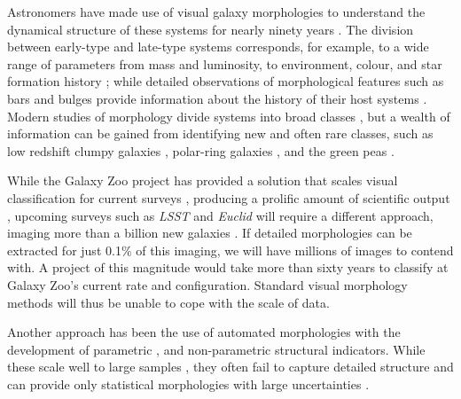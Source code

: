 \documentclass[twocolumn]{aastex6}%
\begin{document}
Astronomers have made use of visual galaxy morphologies to understand the dynamical structure of these systems for nearly ninety years 
\citep[e.g.,][]{Hubble1936, 
			deVauc1959, 
			Sandage1961, 
			vandenBergh1976, 
			NairAbraham2010, 
			Baillard2011}. 
The division between early-type and late-type systems corresponds, for example, to a wide range of parameters from mass and luminosity, to environment, colour, and star formation history 
\citep[e.g.,][]{Kormendy1977,  
			Dressler1980, 
			Strateva2001, 
			Blanton2003, 
			Kauffman2003, 
			Nakamura2003, 
			Shen2003, 
			Peng2010}; 
while detailed observations of morphological features such as bars and bulges 
provide information about the history of their host systems 
\citep[e.g., review by][]{KK04, 
			Elmegreen2008, 
			Sheth2008, 
			Masters2010, 
			Simmons2014}. 
Modern studies of morphology  divide systems into broad classes 
\citep[e.g.,][]{Conselice2006, 
			Lintott2008, 
			Kartaltepe2015, 
			Peth2016}, 
but a wealth of information can be gained from identifying new and often rare classes, 
such as low redshift clumpy galaxies \citep[e.g.,][]{Elmegreen2013}, polar-ring galaxies \citep[e.g.,][]{Whitmore1990}, and the green peas \citep{Cardamone2009}. 


While the Galaxy Zoo project has provided a solution that scales visual classification 
for current surveys \citep{Lintott2008, Lintott2011, Willett2013, Willett2017, Simmons2017},
 producing a prolific amount of scientific output \citep[e.g.,][]{Land2008, Bamford2009,
 Darg2010, Schawinski2014, Galloway2015, Smethurst2016}, upcoming surveys such as
 \textit{LSST} and \textit{Euclid} will require a different approach, imaging more than
 a billion new galaxies  \citep{LSST, Euclid}.  If detailed morphologies can be extracted 
for just  0.1\% of this imaging, we will have millions of images to contend with. 
A project of this magnitude would take more than sixty years to classify at 
Galaxy Zoo's current rate and configuration. Standard visual morphology    
methods will thus be unable to cope with the scale of data. 

Another approach has been the use of automated morphologies with the
 development of parametric \citep{Sersic1968, Odewahn2002, Peng2002}, 
and non-parametric \citep{Abraham1994, Conselice2003, Abraham2003, Lotz2004,
 Freeman2013} structural indicators. While these scale well to large samples 
\citep[e.g.,][]{Simard2011, 
			Griffith2012, 
			Casteels2014, 
			Holwerda2014, 
			Meert2016}, 
they often fail to capture detailed structure and can provide only statistical morphologies with large uncertainties \cite[e.g.,][]{Abraham1996, Bershady2000}. 
\end{document}
